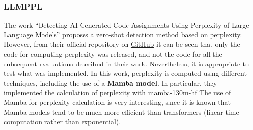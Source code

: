 \clearpage
\subsubsection{LLMPPL}
The work “Detecting AI-Generated Code Assignments Using Perplexity 
of Large Language Models” proposes a zero-shot detection method based 
on perplexity. However, from their official repository on 
\href{https://github.com/Arrtourz/llmppl}{GitHub} 
it can be seen that only the code for computing perplexity was released, 
and not the code for all the subsequent evaluations described in their 
work. Nevertheless, it is appropriate to test what was implemented. 
In this work, perplexity is computed using different techniques, 
including the use of a \textbf{Mamba model}. 
In particular, they implemented the calculation of 
perplexity with \href{https://huggingface.co/state-spaces/mamba-130m-hf}{mamba-130m-hf}
The use of Mamba for perplexity 
calculation is very interesting, since it is known that Mamba models 
tend to be much more efficient than transformers 
(linear-time computation rather than exponential).

